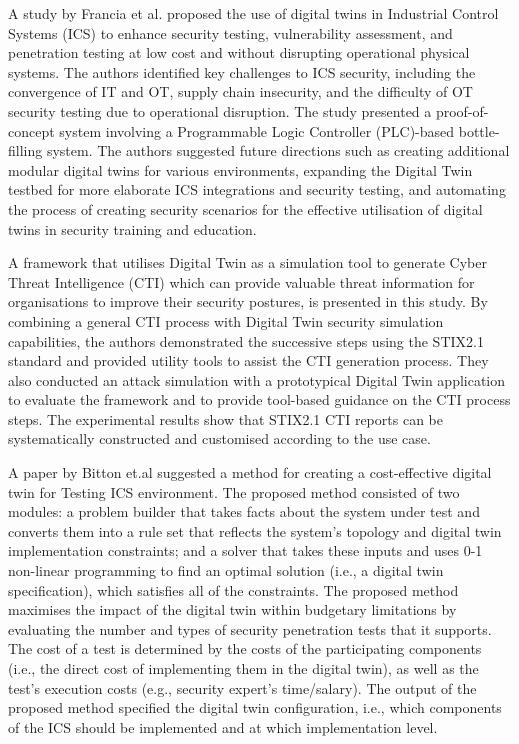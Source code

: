 A study by Francia et al.\cite{franciaDigitalTwinsIndustrial2021} proposed the use of digital twins in Industrial Control Systems (ICS) to enhance security testing, vulnerability assessment, and penetration testing at low cost and without disrupting operational physical systems. The authors identified key challenges to ICS security, including the convergence of IT and OT, supply chain insecurity, and the difficulty of OT security testing due to operational disruption. The study presented a proof-of-concept system involving a Programmable Logic Controller (PLC)-based bottle-filling system. The authors suggested future directions such as creating additional modular digital twins for various environments, expanding the Digital Twin testbed for more elaborate ICS integrations and security testing, and automating the process of creating security scenarios for the effective utilisation of digital twins in security training and education.

A framework that utilises Digital Twin as a simulation tool to generate Cyber Threat Intelligence (CTI) which can provide valuable threat information for organisations to improve their security postures, is presented in this study\cite{dietzHarnessingDigitalTwin2022}. By combining a general CTI process with Digital Twin security simulation capabilities, the authors demonstrated the successive steps using the STIX2.1 standard and provided utility tools to assist the CTI generation process. They also conducted an attack simulation with a prototypical Digital Twin application to evaluate the framework and to provide tool-based guidance on the CTI process steps. The experimental results show that STIX2.1 CTI reports can be systematically constructed and customised according to the use case. 


A paper by Bitton et.al \cite{bittonDerivingCostEffectiveDigital2018a} suggested a method for creating a cost-effective digital twin for Testing ICS environment. The proposed method consisted of two modules: a problem builder that takes facts about the system under test and converts them into a rule set that reflects the system's topology and digital twin implementation constraints; and a solver that takes these inputs and uses 0-1 non-linear programming to find an optimal solution (i.e., a digital twin specification), which satisfies all of the constraints. The proposed method maximises the impact of the digital twin within budgetary limitations by evaluating the number and types of security penetration tests that it supports. The cost of a test is determined by the costs of the participating components (i.e., the direct cost of implementing them in the digital twin), as well as the test's execution costs (e.g., security expert's time/salary). The output of the proposed method specified the digital twin configuration, i.e., which components of the ICS should be implemented and at which implementation level.

